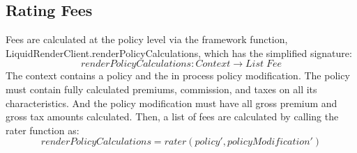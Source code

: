 \subsection{Rating Fees}
Fees are calculated at the policy level via the framework function, LiquidRenderClient.renderPolicyCalculations, which has the
simplified signature:
\begin{equation*}
  renderPolicyCalculations: Context \to List \; Fee
\end{equation*}
The context contains a policy and the in process policy modification. The policy must contain fully calculated premiums, commission, and taxes
on all its characteristics. And the policy modification must have all gross premium and gross tax amounts calculated.
Then, a list of fees are calculated by calling the rater function as:
\begin{equation*}
renderPolicyCalculations = rater(policy', policyModification')
\end{equation*}

